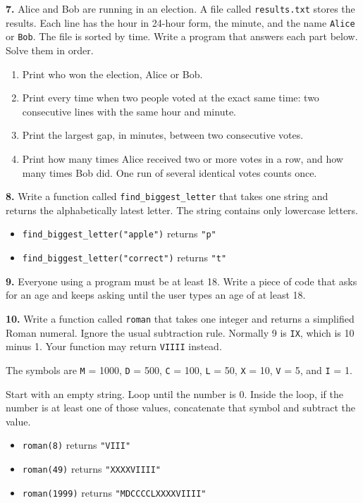 \documentclass[11pt]{article}
\begin{document}
\textbf{7.} Alice and Bob are running in an election. A file called \texttt{results.txt} stores the results. Each line has the hour in 24-hour form, the minute, and the name \texttt{Alice} or \texttt{Bob}. The file is sorted by time. Write a program that answers each part below. Solve them in order.

\begin{enumerate}
    \item[a.] Print who won the election, Alice or Bob.
    \item[b.] Print every time when two people voted at the exact same time: two consecutive lines with the same hour and minute.
    \item[c.] Print the largest gap, in minutes, between two consecutive votes.
    \item[d.] Print how many times Alice received two or more votes in a row, and how many times Bob did. One run of several identical votes counts once.
\end{enumerate}

\textbf{8.} Write a function called \texttt{find\_biggest\_letter} that takes one string and returns the alphabetically latest letter. The string contains only lowercase letters.

\begin{itemize}
    \item \texttt{find\_biggest\_letter("apple")} returns \texttt{"p"}
    \item \texttt{find\_biggest\_letter("correct")} returns \texttt{"t"}
\end{itemize}

\textbf{9.} Everyone using a program must be at least 18. Write a piece of code that asks for an age and keeps asking until the user types an age of at least 18.

\textbf{10.} Write a function called \texttt{roman} that takes one integer and returns a simplified Roman numeral. Ignore the usual subtraction rule. Normally 9 is \texttt{IX}, which is 10 minus 1. Your function may return \texttt{VIIII} instead.

The symbols are \texttt{M} = 1000, \texttt{D} = 500, \texttt{C} = 100, \texttt{L} = 50, \texttt{X} = 10, \texttt{V} = 5, and \texttt{I} = 1.

Start with an empty string. Loop until the number is 0. Inside the loop, if the number is at least one of those values, concatenate that symbol and subtract the value.

\begin{itemize}
    \item \texttt{roman(8)} returns \texttt{"VIII"}
    \item \texttt{roman(49)} returns \texttt{"XXXXVIIII"}
    \item \texttt{roman(1999)} returns \texttt{"MDCCCCLXXXXVIIII"}
\end{itemize}
\end{document}
